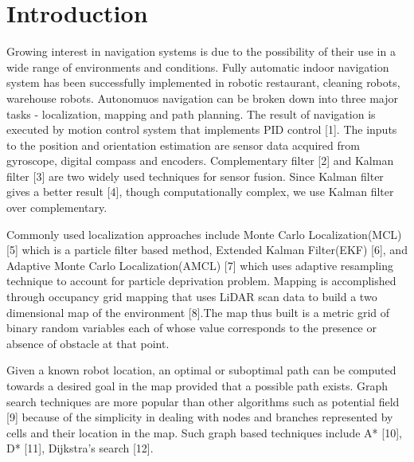 \documentclass[journal,twoside]{IEEEtran}
\begin{document}
\section{Introduction}
\noindent Growing interest in navigation systems is due to the possibility of their use in a wide range of environments and conditions. Fully automatic indoor navigation system has been successfully implemented in robotic restaurant, cleaning robots, warehouse robots. Autonomuos navigation can be broken down into three major tasks - localization, mapping and path planning. The result of navigation is executed by motion control system that implements PID control [1]. The inputs to the position and orientation estimation are sensor data acquired from gyroscope, digital compass and encoders. Complementary filter [2] and Kalman filter [3] are two widely used techniques for sensor fusion. Since Kalman filter gives a better result [4], though computationally complex, we use Kalman filter over complementary. \par\noindent Commonly used localization approaches include Monte Carlo Localization(MCL) [5] which is a particle filter based method, Extended Kalman Filter(EKF) [6], and Adaptive Monte Carlo Localization(AMCL) [7] which uses adaptive resampling technique to account for particle deprivation problem. Mapping is accomplished through occupancy grid mapping that uses LiDAR scan data to build a two dimensional map of the environment [8].The map thus built is a metric grid of binary random variables each of whose value corresponds to the presence or absence of obstacle at that point. \par\noindent Given a known robot location, an optimal or suboptimal path can be computed towards a desired goal in the map provided that a possible path exists. Graph search techniques are more popular than other algorithms such as potential field [9] because of the simplicity in dealing with nodes and branches represented by cells and their location in the map. Such graph based techniques include A* [10], D* [11], Dijkstra’s search [12]. 
\end{document}
